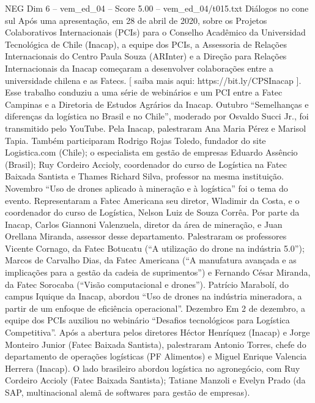 \begin{textsample}{NEG Dim 6 – vem\_ed\_04 – Score 5.00 – vem\_ed\_04/t015.txt}  \label{ex:f6_neg_025}
Diálogos no cone sul Após uma apresentação, em 28 de abril de 2020, sobre os Projetos Colaborativos Internacionais (PCIs) para o Conselho Acadêmico da Universidad Tecnológica de Chile (Inacap), a equipe dos PCIs, a Assessoria de Relações Internacionais do Centro Paula Souza (ARInter) e a Direção para Relações Internacionais da Inacap começaram a desenvolver colaborações entre a universidade chilena e as Fatecs. [ saiba mais aqui: https://bit.ly/CPSInacap ].
Esse trabalho conduziu a uma série de webinários e um PCI entre a Fatec Campinas e a Diretoria de Estudos Agrários da Inacap.
Outubro “Semelhanças e diferenças da logística no Brasil e no Chile”, moderado por Osvaldo Succi Jr., foi transmitido pelo YouTube.
Pela Inacap, palestraram Ana Maria Pérez e Marisol Tapia.
Também participaram Rodrigo Rojas Toledo, fundador do site Logistica.com (Chile); o especialista em gestão de empresas Eduardo Assêncio (Brasil); Ruy Cordeiro Accioly, coordenador do curso de Logística na Fatec Baixada Santista e Thames Richard Silva, professor na mesma instituição.
Novembro “Uso de drones aplicado à mineração e à logística” foi o tema do evento.
Representaram a Fatec Americana seu diretor, Wladimir da Costa, e o coordenador do curso de Logística, Nelson Luiz de Souza Corrêa.
Por parte da Inacap, Carlos Giannoni Valenzuela, diretor da área de mineração, e Juan Orellana Miranda, assessor desse departamento.
Palestraram os professores Vicente Cornago, da Fatec Botucatu (“A utilização do drone na indústria 5.0”); Marcos de Carvalho Dias, da Fatec Americana (“A manufatura avançada e as implicações para a gestão da cadeia de suprimentos”) e Fernando César Miranda, da Fatec Sorocaba (“Visão computacional e drones”).
Patrício Marabolí, do campus Iquique da Inacap, abordou “Uso de drones na indústria mineradora, a partir de um enfoque de eficiência operacional”.
Dezembro Em 2 de dezembro, a equipe dos PCIs auxiliou no webinário “Desafios tecnológicos para Logística Competitiva”.
Após a abertura pelos diretores Héctor Henríquez (Inacap) e Jorge Monteiro Junior (Fatec Baixada Santista), palestraram Antonio Torres, chefe do departamento de operações logísticas (PF Alimentos) e Miguel Enrique Valencia Herrera (Inacap).
O lado brasileiro abordou logística no agronegócio, com Ruy Cordeiro Accioly (Fatec Baixada Santista); Tatiane Manzoli e Evelyn Prado (da SAP, multinacional alemã de softwares para gestão de empresas).

\end{textsample}
